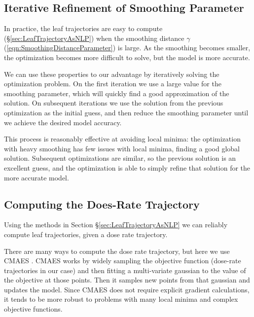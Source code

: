 \subsection{Iterative Refinement of Smoothing Parameter}

In practice, the leaf trajectories are easy to compute (\S\ref{sec:LeafTrajectoryAsNLP})
when the smoothing distance $\gamma$ (\ref{eqn:SmoothingDistanceParameter}) is large.
As the smoothing becomes smaller, the optimization becomes more difficult to solve,
but the model is more accurate.

We can use these properties to our advantage by iteratively solving the optimization problem.
On the first iteration we use a large value for the smoothing parameter,
which will quickly find a good approximation of the solution.
On subsequent iterations we use the solution from the previous optimization as the initial guess,
and then reduce the smoothing parameter until we achieve the desired model accuracy.

This process is reasonably effective at avoiding local minima:
the optimization with heavy smoothing has few issues with local minima, finding a good global solution.
Subsequent optimizations are similar, so the previous solution is an excellent guess, and the optimization
is able to simply refine that solution for the more accurate model.


\subsection{Computing the Does-Rate Trajectory}

Using the methods in Section \S \ref{sec:LeafTrajectoryAsNLP} we can reliably compute leaf
trajectories, given a dose rate trajectory.

There are many ways to compute the dose rate trajectory, but here we use CMAES \cite{Hansen2001}.
CMAES works by widely sampling the objective function (dose-rate trajectories in our case) and then
fitting a multi-variate gaussian to the value of the objective at those points.
Then it samples new points from that gaussian and updates the model.
Since CMAES does not require explicit gradient calculations, it tends to be more robust to problems
with many local minima and complex objective functions.

